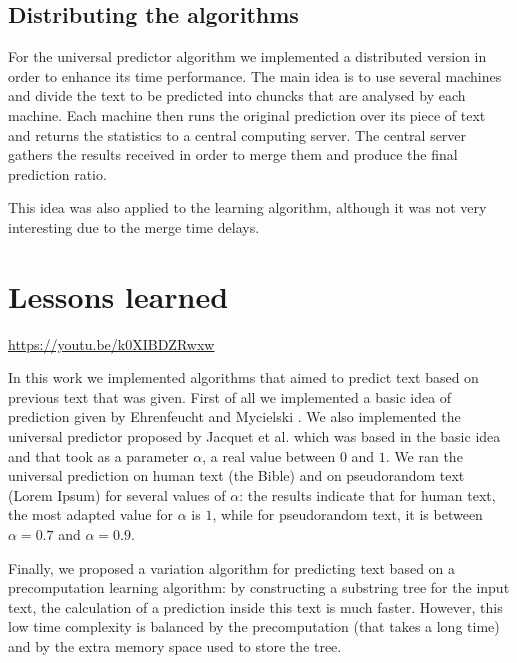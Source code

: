 \documentclass[a4paper,12pt]{article}
\begin{document}
  \subsection{Distributing the algorithms}

  For the universal predictor algorithm we implemented a distributed version in order to enhance its time performance. The main idea is to use several machines and divide the text to be predicted into chuncks that are analysed by each machine. Each machine then runs the original prediction over its piece of text and returns the statistics to a central computing server. The central server gathers the results received in order to merge them and produce the final prediction ratio.

  This idea was also applied to the learning algorithm, although it was not very interesting due to the merge time delays.
  
\section*{Lessons learned}

\begin{center}
\url{https://youtu.be/k0XIBDZRwxw}
\end{center}

In this work we implemented algorithms that aimed to predict text based on previous text that was given. First of all we implemented a basic idea of prediction given by Ehrenfeucht and Mycielski \cite{basic_algo}. We also implemented the universal predictor proposed by Jacquet et al. \cite{paper} which was based in the basic idea and that took as a parameter $\alpha$, a real value between $0$ and $1$. We ran the universal prediction on human text (the Bible) and on pseudorandom text (Lorem Ipsum) for several values of $\alpha$: the results indicate that for human text, the most adapted value for $\alpha$ is $1$, while for pseudorandom text, it is between $\alpha=0.7$ and $\alpha=0.9$.

Finally, we proposed a variation algorithm for predicting text based on a precomputation learning algorithm: by constructing a substring tree for the input text, the calculation of a prediction inside this text is much faster. However, this low time complexity is balanced by the precomputation (that takes a long time) and by the extra memory space used to store the tree.



\end{document}
